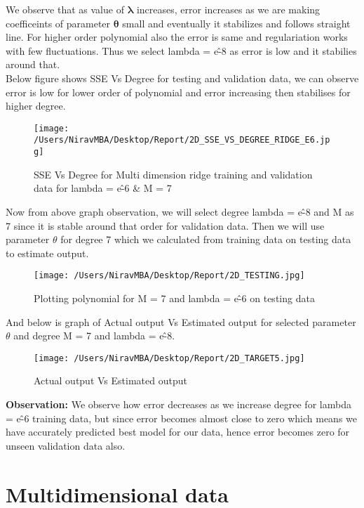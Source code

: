 \documentclass[12pt]{report}
\begin{document}
We observe that as value of $ \mathbf{\lambda} $ increases, error increases as we are making coefficeints of parameter $ \mathbf{\theta} $ small and eventually it stabilizes and follows straight line. For higher order polynomial also the error is same and regulariation works with few fluctuations. Thus we select lambda = e\^-8 as error is low and it stabilies around that. \\

Below figure shows SSE Vs Degree for testing and validation data, we can observe error is low for lower order of polynomial and error increasing then stabilises for higher degree. \\

\begin{figure}[H]
	\centering
	\texttt{[image: /Users/NiravMBA/Desktop/Report/2D\_SSE\_VS\_DEGREE\_RIDGE\_E6.jpg]}
	\caption{SSE Vs Degree for Multi dimension ridge training and validation data for lambda = e\^-6  \& M = 7} 
\end{figure}


Now from above graph observation, we will select degree lambda = e\^-8  and M as 7 since it is stable around that order for validation data. Then we will use parameter $ {\theta } $ for degree 7 which we calculated from training data on testing data to estimate output.\\

\begin{figure}[H]
	\centering
	\texttt{[image: /Users/NiravMBA/Desktop/Report/2D\_TESTING.jpg]}
	\caption{Plotting polynomial for M = 7 and lambda = e\^-6 on testing data} 
\end{figure}


And below is graph of Actual output Vs Estimated output for selected parameter $ {\theta } $ and degree M = 7 and lambda = e\^-8.

\begin{figure}[H]
	
	\texttt{[image: /Users/NiravMBA/Desktop/Report/2D\_TARGET5.jpg]}
	\caption{Actual output Vs Estimated output} 
\end{figure}


{\bfseries Observation: } 
We observe how error decreases as we increase degree for lambda = e\^-6 training data, but since error becomes almost close to zero which means we have accurately predicted best model for our data, hence error becomes zero for unseen validation data also.

\section{Multidimensional data}
\end{document}
